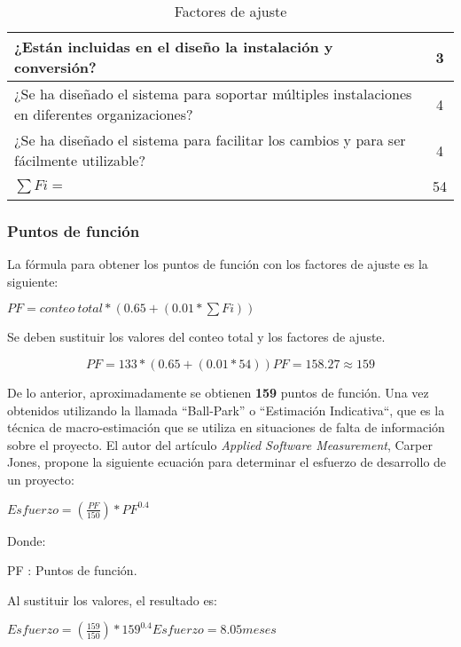 \begin{table}[h!]
\begin{tabular}{|p{9cm}|c|}
		¿Están incluidas en el diseño la instalación y conversión?                                                               & 3           \\ \hline
		¿Se ha diseñado el sistema para soportar múltiples instalaciones en diferentes organizaciones?                           & 4           \\ \hline
		¿Se ha diseñado el sistema para facilitar los cambios y para ser fácilmente utilizable?                                  & 4           \\ \hline
		\centering $\sum Fi=$                                                                                                  	 & 54          \\ \hline
		\end{tabular}
		\caption{Factores de ajuste}
		\label{tab:questions_adjusment}
		\end{table}


\subsubsection{Puntos de función}

La fórmula para obtener los puntos de función con los factores de ajuste es la siguiente:


\begin{center}
	$
	PF = conteo\ total *  (0.65 + (0.01 * \sum Fi))
	$


	Se deben sustituir los valores del conteo total y los factores de ajuste.


	\begin{equation}
		PF =  133 *  (0.65 + (0.01 * 54))
		PF = 158.27 \approx 159
	\end{equation}
\end{center}

De lo anterior, aproximadamente se obtienen \textbf{159} puntos de función. Una vez obtenidos utilizando la llamada “Ball-Park” o “Estimación Indicativa“, que es la técnica de macro-estimación que se utiliza en situaciones de falta de información sobre el proyecto. El autor del artículo \textit{Applied Software Measurement}\cite{abran_applied_2006}, Carper Jones, propone la siguiente ecuación para determinar el esfuerzo de desarrollo de un proyecto:


\begin{center}
	$
	Esfuerzo = (\frac{PF}{150})*PF^{0.4}
	$


	Donde:


	PF : Puntos de función.


	Al sustituir los valores, el resultado es:

	$
	Esfuerzo = (\frac{159}{150})*159^{0.4}
	Esfuerzo = 8.05 meses
	$
\end{center}



